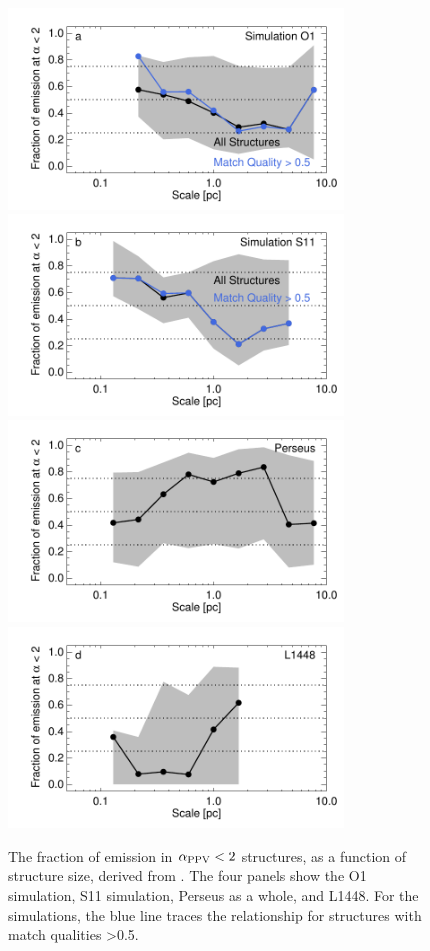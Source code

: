 \begin{figure}[htbp]
\centering
\includegraphics[width=3.5in , trim=0 .5in 0 0, clip]{figures/stella_virial_size}
\includegraphics[width=3.5in,  trim=0 .5in 0 0, clip]{figures/rahul_virial_size}
\includegraphics[width=3.5in,  trim=0 .5in 0 0, clip]{figures/perseus_virial_size}
\includegraphics[width=3.5in]{figures/l1448_virial_size}

\caption{The fraction of emission in $\alpha_{\rm PPV} < 2$ structures, as a function of structure size, derived from \coc. The four panels show the O1 simulation, S11 simulation, Perseus as a whole, and L1448.  For the simulations, the blue line traces the relationship for structures with match qualities \textgreater 0.5.}
\label{fig:size_virial}
\end{figure}

